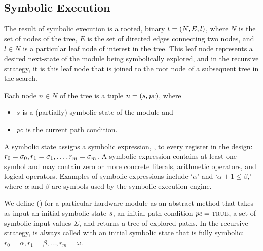 \subsection{Symbolic Execution}
The result of symbolic execution is a rooted, binary $t = (N, E, l)$, where
$N$ is the set of nodes of the tree, $E$ is the set of directed edges connecting
two nodes, and $l \in N$ is a particular leaf node of interest in the tree. This
leaf node represents a desired next-state of the module being symbolically
explored, and in the recursive strategy, it is this leaf node that is joined to
the root node of a subsequent tree in the search.

Each node $n \in N$ of the tree is a tuple $n = (s, \mathit{pc})$, where
\begin{itemize}
\item $s$ is a (partially) symbolic state of the module and
\item $\mathit{pc}$ is the current path condition.
\end{itemize}

A symbolic state assigns a symbolic expression, \symexpression, to every register in the design: $r_0 =
\sigma_0, r_1 = \sigma_1, \ldots, r_m = \sigma_m$. A symbolic expression
\symexpression{} contains at least one symbol and may contain zero or more concrete
literals, arithmetic operators, and logical operators. Examples of
symbolic expressions include `$\alpha$' and `$\alpha + 1 \le \beta$,' where
$\alpha$ and 
$\beta$ are symbols used by the symbolic execution engine.

We define \symexecution() for a particular hardware module as an abstract method
that takes as input an initial symbolic
state $s$, an initial path condition $\mathit{pc} = \mathtt{\textsc{true}}$, a
set of symbolic input values $\Sigma$, and 
returns a tree of explored paths. In the recursive strategy, \symexecution{} is
always called with an initial
symbolic state that is fully symbolic: $r_0 = \alpha, r_1 = \beta, \ldots, r_m = \omega$.




